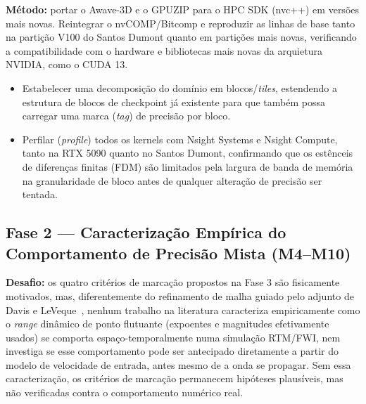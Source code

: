 \documentclass[12pt,a4paper]{article}
\begin{document}
\textbf{Método:} portar o Awave-3D e o GPUZIP para o HPC SDK (nvc++) em versões mais novas. 
Reintegrar o nvCOMP/Bitcomp e reproduzir as linhas de base tanto na
partição V100 do Santos Dumont quanto em partições mais novas, verificando a compatibilidade com o hardware 
e bibliotecas mais novas da arquietura NVIDIA, como o CUDA 13.

\begin{itemize}
  \item Estabelecer uma decomposição do domínio em blocos/\emph{tiles},
        estendendo a estrutura de blocos de checkpoint já existente para
        que também possa carregar uma marca (\emph{tag}) de precisão por
        bloco.
  \item Perfilar (\emph{profile}) todos os kernels com Nsight Systems e
        Nsight Compute, tanto na RTX 5090 quanto no Santos Dumont,
        confirmando que os estênceis de diferenças finitas (FDM) são
        limitados pela largura de banda de memória na granularidade de
        bloco antes de qualquer alteração de precisão ser tentada.
\end{itemize}

\subsection{Fase 2 --- Caracterização Empírica do Comportamento de
Precisão Mista (M4--M10)}

\textbf{Desafio:} os quatro critérios de marcação propostos na Fase 3 são
fisicamente motivados, mas, diferentemente do refinamento de malha
guiado pelo adjunto de Davis e LeVeque~\cite{davis2015adjoint}, nenhum
trabalho na literatura caracteriza empiricamente como o \emph{range}
dinâmico de ponto flutuante (expoentes e magnitudes efetivamente usados)
se comporta espaço-temporalmente numa simulação RTM/FWI, nem investiga se
esse comportamento pode ser antecipado diretamente a partir do modelo de
velocidade de entrada, antes mesmo de a onda se propagar. Sem essa
caracterização, os critérios de marcação permanecem hipóteses plausíveis,
mas não verificadas contra o comportamento numérico real.
\end{document}

